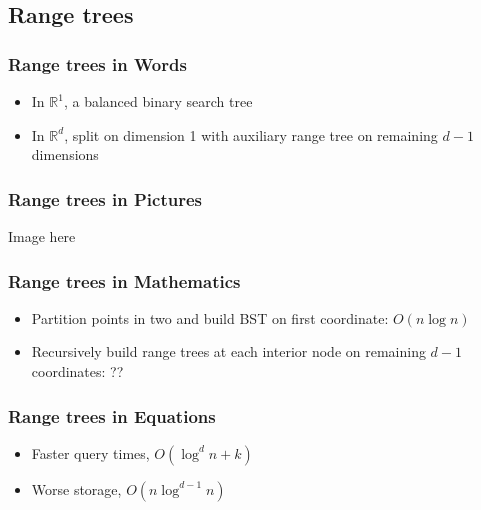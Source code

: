 \documentclass{beamer}
\begin{document}
\subsection{Range trees}

\begin{frame}
  \frametitle{Range trees in Words}
  \begin{itemize}
  \item<1-> In $\mathbb{R}^1$, a balanced binary search tree
  \item<2> In $\mathbb{R}^d$, split on dimension 1 with auxiliary
    range tree on remaining $d-1$ dimensions
  \end{itemize}
\end{frame}

\begin{frame}
  \frametitle{Range trees in Pictures}

  {\huge Image here}
\end{frame}

\begin{frame}
  \frametitle{Range trees in Mathematics}

  \begin{itemize}
  \item Partition points in two and build BST on first coordinate:
    $O(n\log n)$
  \item Recursively build range trees at each interior node on
    remaining $d-1$ coordinates: ??
  \end{itemize}
\end{frame}

\begin{frame}
  \frametitle{Range trees in Equations}
  \begin{itemize}
  \item Faster query times, $O(\log^d n + k)$
  \item Worse storage, $O(n \log^{d-1} n)$
  \end{itemize}
\end{frame}
\end{document}
